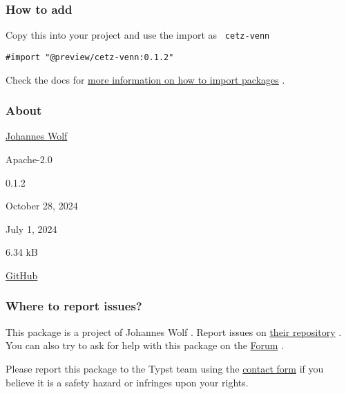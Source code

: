 \subsubsection{How to add}\label{how-to-add}

Copy this into your project and use the import as \texttt{\ cetz-venn\ }

\begin{verbatim}
#import "@preview/cetz-venn:0.1.2"
\end{verbatim}



Check the docs for
\href{https://typst.app/docs/reference/scripting/\#packages}{more
information on how to import packages} .

\subsubsection{About}\label{about}

\begin{description}
\tightlist
\item[Author :]
\href{https://github.com/johannes-wolf}{Johannes Wolf}
\item[License:]
Apache-2.0
\item[Current version:]
0.1.2
\item[Last updated:]
October 28, 2024
\item[First released:]
July 1, 2024
\item[Archive size:]
6.34 kB
\href{https://packages.typst.org/preview/cetz-venn-0.1.2.tar.gz}{\pandocbounded{}}
\item[Repository:]
\href{https://github.com/johannes-wolf/cetz-venn}{GitHub}
\end{description}

\subsubsection{Where to report issues?}\label{where-to-report-issues}

This package is a project of Johannes Wolf . Report issues on
\href{https://github.com/johannes-wolf/cetz-venn}{their repository} .
You can also try to ask for help with this package on the
\href{https://forum.typst.app}{Forum} .

Please report this package to the Typst team using the
\href{https://typst.app/contact}{contact form} if you believe it is a
safety hazard or infringes upon your rights.

